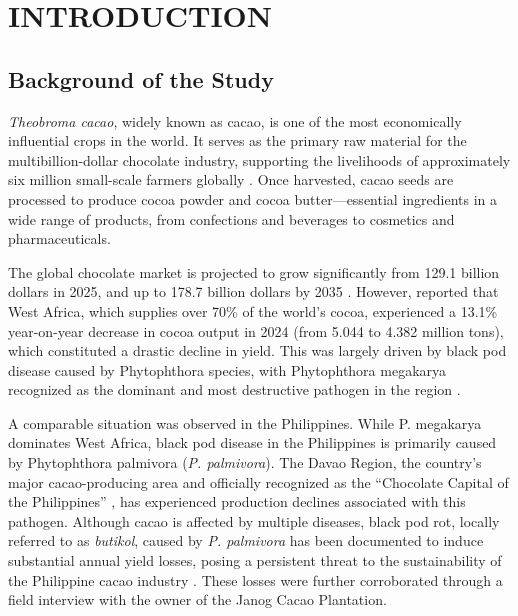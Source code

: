 \chapter{INTRODUCTION}

{\baselineskip

	\section{Background of the Study}
	\textit{Theobroma cacao}, widely known as cacao, is one of the most economically influential crops in the world. It serves as the primary raw material for the multibillion-dollar chocolate industry, supporting the livelihoods of approximately six million small-scale farmers globally \citep{wickramasuriya2018cacao}. Once harvested, cacao seeds are processed to produce cocoa powder and cocoa butter—essential ingredients in a wide range of products, from confections and beverages to cosmetics and pharmaceuticals.
	
	The global chocolate market is projected to grow significantly from 129.1 billion dollars in 2025, and up to 178.7 billion dollars by 2035 \citep{FutureMarketInsights2025ChocolateForecast}. However, \cite{Exquisito2025CocoaShortage} reported that West Africa, which supplies over 70\% of the world’s cocoa, experienced a 13.1\% year-on-year decrease in cocoa output in 2024 (from 5.044 to 4.382 million tons), which constituted a drastic decline in yield. This was largely driven by black pod disease caused by Phytophthora species, with Phytophthora megakarya recognized as the dominant and most destructive pathogen in the region \citep{OpokuMegakaryaThreat, BlackPodReview2024}.
	
	A comparable situation was observed in the Philippines. While P. megakarya dominates West Africa, black pod disease in the Philippines is primarily caused by Phytophthora palmivora (\textit{P. palmivora}). The Davao Region, the country’s major cacao-producing area and officially recognized as the “Chocolate Capital of the Philippines” \citep{PCAF2021}, has experienced production declines associated with this pathogen. Although cacao is affected by multiple diseases, black pod rot, locally referred to as \textit{butikol}, caused by \textit{P. palmivora} has been documented to induce substantial annual yield losses, posing a persistent threat to the sustainability of the Philippine cacao industry \citep{Avila2023}. These losses were further corroborated through a field interview with the owner of the Janog Cacao Plantation.
	
}

